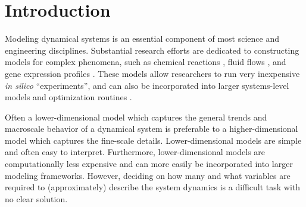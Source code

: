 

\chapter{Introduction\label{ch:intro}}

Modeling dynamical systems is an essential component of most science and engineering disciplines.
%
Substantial research efforts are dedicated to constructing models for complex phenomena, such as chemical reactions \cite{dong2007simplification, gillespie1977exact, gallagher1986combined}, fluid flows \cite{anderson1995computational}, and gene expression profiles \cite{bar2004analyzing, storey2005significance}.
%
These models allow researchers to run very inexpensive {\em in silico} ``experiments'', and can also be incorporated into larger systems-level models and optimization routines \cite{daoutidis2013engineering, oluwole2006rigorous, rubert2014advanced}.

Often a lower-dimensional model which captures the general trends and macroscale behavior of a dynamical system is preferable to a higher-dimensional model which captures the fine-scale details.
%
Lower-dimensional models are simple and often easy to interpret.
%
Furthermore, lower-dimensional models are computationally less expensive and can more easily be incorporated into larger modeling frameworks.
%
However, deciding on how many and what variables are required to (approximately) describe the system dynamics is a difficult task with no clear solution.


